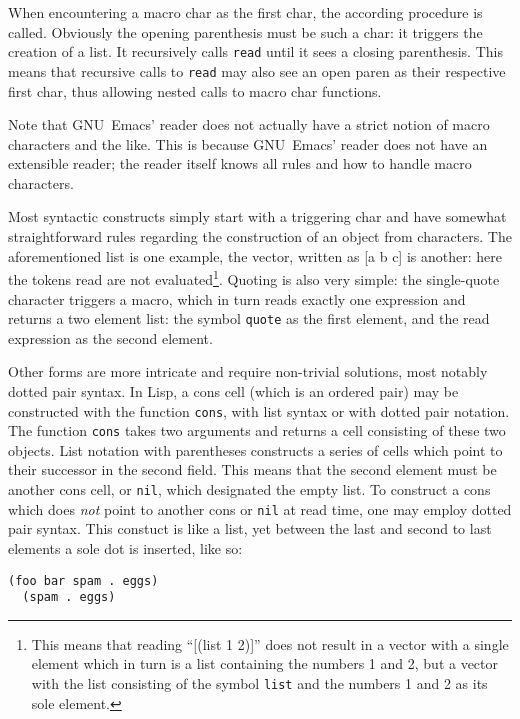 \documentclass[a4paper,10pt,twoside]{article}
\newcommand{\sym}[1]{\texttt{#1}}
\newcommand{\fun}[1]{\texttt{#1}}
\newcommand{\emacs}{GNU~Emacs}
\newcommand{\Read}{\fun{read}}
\newcommand{\nil}{\sym{nil}}
\begin{document}
When encountering a macro char as the first char, the according procedure is
called.  Obviously the opening parenthesis must be such a char: it triggers the
creation of a list.  It recursively calls \Read{} until it sees a closing
parenthesis.  This means that recursive calls to \Read{} may also see an open
paren as their respective first char, thus allowing nested calls to macro char
functions.

Note that \emacs{}’ reader does not actually have a strict notion of macro
characters and the like.  This is because \emacs{}’ reader does not have an
extensible reader; the reader itself knows all rules and how to handle macro
characters.

Most syntactic constructs simply start with a triggering char and have somewhat
straightforward rules regarding the construction of an object from characters.
The aforementioned list is one example, the vector, written as [a b c] is
another: here the tokens read are not evaluated\footnote{This means that reading
``[(list 1 2)]'' does not result in a vector with a single element which in turn
is a list containing the numbers 1 and 2, but a vector with the list consisting
of the symbol \sym{list} and the numbers 1 and 2 as its sole element.}.  Quoting
is also very simple: the single-quote character triggers a macro, which in turn
reads exactly one expression and returns a two element list: the symbol
\sym{quote} as the first element, and the read expression as the second element.

Other forms are more intricate and require non-trivial solutions, most notably
dotted pair syntax.  In Lisp, a cons cell (which is an ordered pair) may be
constructed with the function \fun{cons}, with list syntax or with dotted pair
notation.  The function \fun{cons} takes two arguments and returns a cell
consisting of these two objects.  List notation with parentheses constructs a
series of cells which point to their successor in the second field.  This means
that the second element must be another cons cell, or \nil{}, which designated the
empty list.  To construct a cons which does \emph{not} point to another cons or
\nil{} at read time, one may employ dotted pair syntax.  This constuct is like a
list, yet between the last and second to last elements a sole dot is inserted,
like so:

\begin{lstlisting}[style=lispinline]
  (foo bar spam . eggs)
  (spam . eggs)
\end{lstlisting}
\end{document}
